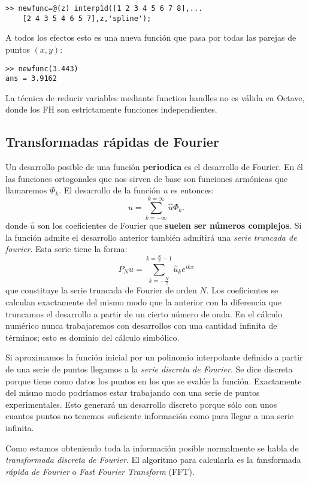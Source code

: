 \begin{verbatim}
>> newfunc=@(z) interp1d([1 2 3 4 5 6 7 8],...
    [2 4 3 5 4 6 5 7],z,'spline');
\end{verbatim}

A todos los efectos esto es una nueva función que pasa por todas las
parejas de puntos $(x,y)$:

\begin{verbatim}
>> newfunc(3.443)
ans = 3.9162
\end{verbatim}

La técnica de reducir variables mediante function handles no es válida
en Octave, donde los FH son estrictamente funciones independientes.


\subsection{Transformadas rápidas de Fourier}

Un desarrollo posible de una función \textbf{periodica} es el
desarrollo de Fourier. En él las funciones ortogonales que nos sirven
de base son funciones armónicas que llamaremos $\Phi_{k}$. El
desarrollo de la función $u$ es entonces:
$$u=\sum_{k=-\infty}^{k=\infty}\hat{u}\Phi_{k}.$$ donde $\hat{u}$ son
los coeficientes de Fourier que \textbf{suelen ser números complejos}.
Si la función admite el desarrollo anterior también admitirá una
\emph{serie truncada de fourier}. Esta serie tiene la forma:
$$P_{N}u=\sum_{k=-\frac{N}{2}}^{k=\frac{N}{2}-1}\hat{u}_{k}e^{ikx}$$
que constituye la serie truncada de Fourier de orden $N$. Los
coeficientes se calculan exactamente del mismo modo que la anterior
con la diferencia que truncamos el desarrollo a partir de un cierto
número de onda.  En el cálculo numérico nunca trabajaremos con
desarrollos con una cantidad infinita de términos; esto es dominio del
cálculo simbólico.

Si aproximamos la función inicial por un polinomio interpolante
definido a partir de una serie de puntos llegamos a la \emph{serie
  discreta de Fourier}. Se dice discreta porque tiene como datos los
puntos en los que se evalúe la función. Exactamente del mismo modo
podríamos estar trabajando con una serie de puntos experimentales.
Esto generará un desarrollo discreto porque sólo con unos cuantos
puntos no tenemos suficiente información como para llegar a una serie
infinita.

Como estamos obteniendo toda la información posible normalmente se
habla de \emph{transformada discreta de Fourier}. El algoritmo para
calcularla es la \emph{t}ansformada \emph{rápida de Fourier} o
\emph{Fast Fourier Transform} (FFT).

